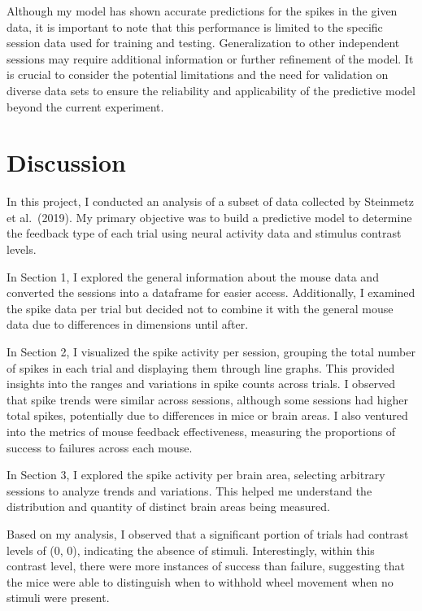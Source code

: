 \documentclass[
]{article}
\begin{document}
Although my model has shown accurate predictions for the spikes in the
given data, it is important to note that this performance is limited to
the specific session data used for training and testing. Generalization
to other independent sessions may require additional information or
further refinement of the model. It is crucial to consider the potential
limitations and the need for validation on diverse data sets to ensure
the reliability and applicability of the predictive model beyond the
current experiment.

\section{Discussion}\label{discussion}

In this project, I conducted an analysis of a subset of data collected
by Steinmetz et al.~(2019). My primary objective was to build a
predictive model to determine the feedback type of each trial using
neural activity data and stimulus contrast levels.

In Section 1, I explored the general information about the mouse data
and converted the sessions into a dataframe for easier access.
Additionally, I examined the spike data per trial but decided not to
combine it with the general mouse data due to differences in dimensions
until after.

In Section 2, I visualized the spike activity per session, grouping the
total number of spikes in each trial and displaying them through line
graphs. This provided insights into the ranges and variations in spike
counts across trials. I observed that spike trends were similar across
sessions, although some sessions had higher total spikes, potentially
due to differences in mice or brain areas. I also ventured into the
metrics of mouse feedback effectiveness, measuring the proportions of
success to failures across each mouse.

In Section 3, I explored the spike activity per brain area, selecting
arbitrary sessions to analyze trends and variations. This helped me
understand the distribution and quantity of distinct brain areas being
measured.

Based on my analysis, I observed that a significant portion of trials
had contrast levels of (0, 0), indicating the absence of stimuli.
Interestingly, within this contrast level, there were more instances of
success than failure, suggesting that the mice were able to distinguish
when to withhold wheel movement when no stimuli were present.
\end{document}
